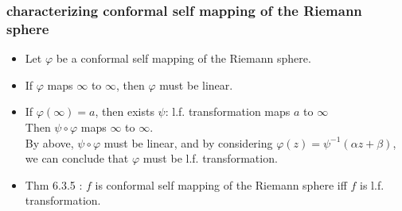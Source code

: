 \documentclass{beamer}
\begin{document}
\begin{frame}
	\frametitle{characterizing conformal self mapping of the Riemann sphere}
	\begin{itemize}
		\item Let $\varphi$ be a conformal self mapping of the Riemann sphere.

		\item If $\varphi$ maps $\infty$ to $\infty$, then $\varphi$ must be linear.

		\item If $\varphi(\infty) = a$, then exists $\psi$: l.f. transformation maps $a$ to $\infty$ \\
			Then $\psi \circ \varphi$ maps $\infty$ to $\infty$.\\
			By above, $\psi \circ \varphi$ must be linear, and by considering $\varphi(z) = \psi^{-1}(\alpha z + \beta)$, we can conclude that $\varphi$ must be l.f. transformation.

		\item Thm 6.3.5 : $f$ is conformal self mapping of the Riemann sphere iff $f$ is l.f. transformation.
	\end{itemize}
\end{frame}
\end{document}
